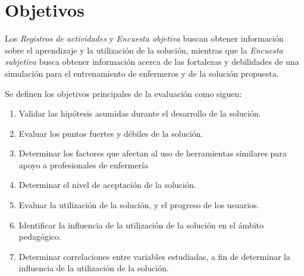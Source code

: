 \section{Objetivos}
\label{sec:objetivos}

Los \emph{Registros de actividades} y \emph{Encuesta objetiva} buscan obtener 
información sobre el aprendizaje y la utilización de la solución, mientras que 
la \emph{Encuesta subjetiva} busca obtener información acerca de las fortalezas y 
debilidades de una simulación para el entrenamiento de enfermeros y de la solución 
propuesta.

Se definen los objetivos principales de la evaluación como siguen:

\begin{enumerate}

\item Validar las hipótesis asumidas durante el desarrollo de la
    solución.

\item Evaluar los puntos fuertes y débiles de la solución.

\item Determinar los factores que afectan al uso de herramientas similares para
    apoyo a profesionales de enfermería
    
\item Determinar el nivel de aceptación de la solución.

\item Evaluar la utilización de la solución, y el progreso de los usuarios.

\item Identificar la influencia de la utilización de la solución en el ámbito
    pedagógico.

\item Determinar correlaciones entre variables estudiadas, a fin de determinar
    la influencia de la utilización de la solución.
    
\end{enumerate}

